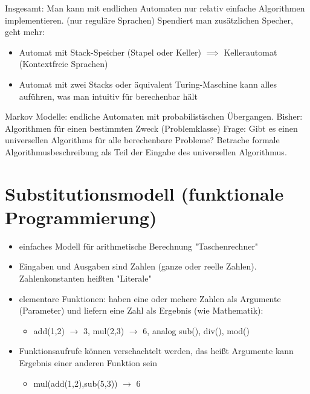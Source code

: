 \documentclass[a4paper]{scrartcl}
\begin{document}
Insgesamt: Man kann mit endlichen Automaten nur relativ einfache Algorithmen implementieren. (nur reguläre Sprachen)
Spendiert man zusätzlichen Specher, geht mehr:
\begin{itemize}
\item Automat mit Stack-Speicher (Stapel oder Keller) $\implies$ Kellerautomat (Kontextfreie Sprachen)
\item Automat mit zwei Stacks oder äquivalent Turing-Maschine kann alles auführen, was man intuitiv für berechenbar hält
\end{itemize}
Markov Modelle: endliche Automaten mit probabilistischen Übergangen.
Bisher: Algorithmen für einen bestimmten Zweck (Problemklasse)
Frage: Gibt es einen universellen Algorithms für alle berechenbare Probleme?
Betrache formale Algorithmusbeschreibung als Teil der Eingabe des universellen Algorithmus.
\section{Substitutionsmodell (funktionale Programmierung)}
\label{sec-4}
\begin{itemize}
\item einfaches Modell für arithmetische Berechnung "Taschenrechner"
\item Eingaben und Ausgaben sind Zahlen (ganze oder reelle Zahlen). Zahlenkonstanten heißten "Literale"
\item elementare Funktionen: haben eine oder mehere Zahlen als Argumente (Parameter) und liefern eine Zahl als Ergebnis (wie Mathematik):
\begin{itemize}
\item add(1,2) $\rightarrow$ 3, mul(2,3) $\rightarrow$ 6, analog sub(), div(), mod()
\end{itemize}
\item Funktionsaufrufe können verschachtelt werden, das heißt Argumente kann Ergebnis einer anderen Funktion sein
\begin{itemize}
\item mul(add(1,2),sub(5,3)) $\rightarrow$ 6
\end{itemize}
\end{itemize}
\end{document}
